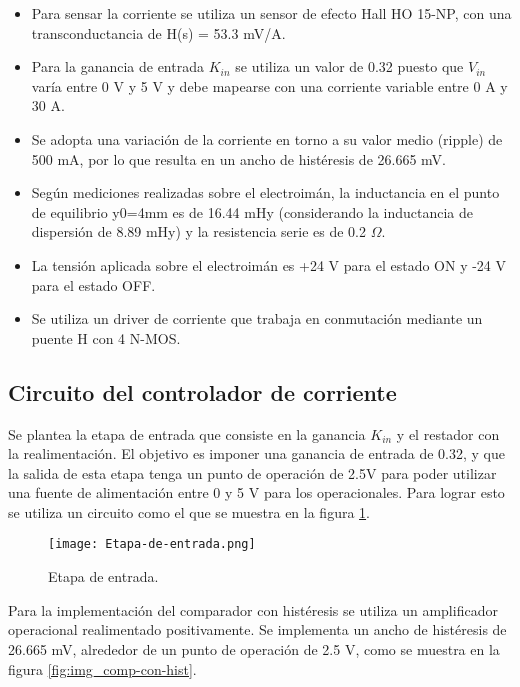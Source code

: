 \begin{itemize}
    \item Para sensar la corriente se utiliza un sensor de efecto Hall HO 15-NP, con una transconductancia de H(s) = 53.3 mV/A.
    \item Para la ganancia de entrada $K_{in}$ se utiliza un valor de 0.32 puesto que $V_{in}$ varía entre 0 V y 5 V y debe mapearse con una corriente variable entre 0 A y 30 A.
    \item Se adopta una variación de la corriente en torno a su valor medio (ripple) de 500 mA, por lo que resulta en un ancho de histéresis de 26.665 mV.
    \item Según mediciones realizadas sobre el electroimán, la inductancia en el punto de equilibrio y0=4mm es de 16.44 mHy (considerando la inductancia de dispersión de 8.89 mHy) y la resistencia serie es de 0.2 $\Omega$.
    \item La tensión aplicada sobre el electroimán es +24 V para el estado ON y -24 V para el estado OFF.
    \item Se utiliza un driver de corriente que trabaja en conmutación mediante un puente H con 4 N-MOS. 
\end{itemize}

\subsection{Circuito del controlador de corriente}

\noindent Se plantea la etapa de entrada que consiste en la ganancia $K_{in}$ y el restador con la realimentación. El objetivo es imponer una ganancia de entrada de 0.32, y que la salida de esta etapa tenga un punto de operación de 2.5V para poder utilizar una fuente de alimentación entre 0 y 5 V para los operacionales. Para lograr esto se utiliza un circuito como el que se muestra en la figura \ref{fig:img_etapa-de-entrada}.

\begin{figure}[H]
	\centering
	\texttt{[image: Etapa-de-entrada.png]}
	\caption{Etapa de entrada.}
	\label{fig:img_etapa-de-entrada}
\end{figure}

\noindent Para la implementación del comparador con histéresis se utiliza un amplificador operacional realimentado positivamente. Se implementa un ancho de histéresis de 26.665 mV,  alrededor de un punto de operación de 2.5 V, como se muestra en la figura \ref{fig:img_comp-con-hist}.

